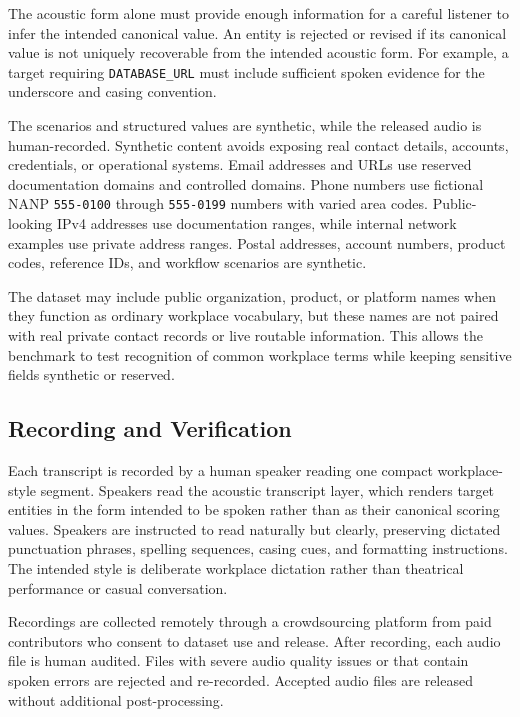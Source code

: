 \documentclass[10pt,twocolumn]{article}
\begin{document}
The acoustic form alone must provide enough information for a careful
listener to infer the intended canonical value. An entity is rejected or
revised if its canonical value is not uniquely recoverable from the
intended acoustic form. For example, a target requiring
\texttt{DATABASE\_URL} must include sufficient spoken evidence for the
underscore and casing convention.

The scenarios and structured values are synthetic, while the released
audio is human-recorded. Synthetic content avoids exposing real contact
details, accounts, credentials, or operational systems. Email addresses
and URLs use reserved documentation domains and controlled domains.
Phone numbers use fictional NANP \texttt{555\mbox{-}0100} through
\texttt{555\mbox{-}0199} numbers with varied area codes. Public-looking IPv4
addresses use documentation ranges, while internal network examples use
private address ranges. Postal addresses, account numbers, product
codes, reference IDs, and workflow scenarios are synthetic.

The dataset may include public organization, product, or platform names
when they function as ordinary workplace vocabulary, but these names are
not paired with real private contact records or live routable
information. This allows the benchmark to test recognition of common
workplace terms while keeping sensitive fields synthetic or reserved.

\subsection{Recording and Verification}\label{recording-verification}

Each transcript is recorded by a human speaker reading one compact
workplace-style segment. Speakers read the acoustic transcript layer,
which renders target entities in the form intended to be spoken rather
than as their canonical scoring values. Speakers are instructed to read
naturally but clearly, preserving dictated punctuation phrases, spelling
sequences, casing cues, and formatting instructions. The intended style is
deliberate workplace dictation rather than theatrical performance or
casual conversation.

Recordings are collected remotely through a crowdsourcing platform from
paid contributors who consent to dataset use and release. After recording,
each audio file is human audited. Files with severe audio quality
issues or that contain spoken errors are rejected and re-recorded.
Accepted audio files are released without additional post-processing.
\end{document}
